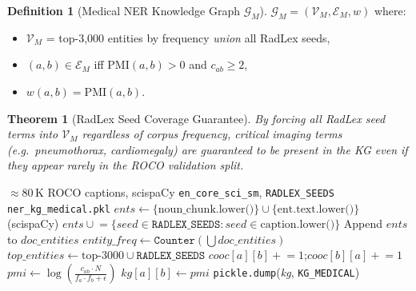 \documentclass[12pt, a4paper]{article}
\theoremstyle{definition}
\newtheorem{definition}{Definition}[section]
\theoremstyle{plain}
\newtheorem{theorem}{Theorem}[section]
\theoremstyle{remark}
\newcommand{\KG}{\mathcal{G}}
\begin{document}
\begin{definition}[Medical NER Knowledge Graph $\KG_M$]
$\KG_M = (\mathcal{V}_M, \mathcal{E}_M, w)$ where:
\begin{itemize}
  \item $\mathcal{V}_M$ = top-3,000 entities by frequency \emph{union} all RadLex seeds,
  \item $(a,b) \in \mathcal{E}_M$ iff $\text{PMI}(a,b) > 0$ and $c_{ab} \geq 2$,
  \item $w(a,b) = \text{PMI}(a,b)$.
\end{itemize}
\end{definition}

\begin{theorem}[RadLex Seed Coverage Guarantee]
By forcing all RadLex seed terms into $\mathcal{V}_M$ regardless of corpus frequency, critical imaging terms (e.g.\ \emph{pneumothorax}, \emph{cardiomegaly}) are guaranteed to be present in the KG even if they appear rarely in the ROCO validation split.
\end{theorem}

\begin{algorithm}[H]
\caption{BUILD\_MEDICAL\_NER\_KG}
\label{alg:kg_medical}
\begin{algorithmic}[1]
\Require $\approx$80\,K ROCO captions, scispaCy \texttt{en\_core\_sci\_sm}, \texttt{RADLEX\_SEEDS}
\Ensure \texttt{ner\_kg\_medical.pkl}
  \State $\textit{ents} \gets \{\text{noun\_chunk.lower()}\} \cup \{\text{ent.text.lower()}\}$ (scispaCy)
  \State $\textit{ents} \mathrel{\cup}= \{\textit{seed} \in \texttt{RADLEX\_SEEDS} : \textit{seed} \in \text{caption.lower()}\}$
  \State Append $\textit{ents}$ to $\textit{doc\_entities}$
\EndFor
\State $\textit{entity\_freq} \gets \texttt{Counter}(\bigcup \textit{doc\_entities})$
\State $\textit{top\_entities} \gets \text{top-}3000 \cup \texttt{RADLEX\_SEEDS}$
    \State $\textit{cooc}[a][b] \mathrel{+}= 1$;\quad $\textit{cooc}[b][a] \mathrel{+}= 1$
  \EndFor
\EndFor
{}
  \State $\textit{pmi} \gets \log\!\left(\frac{c_{ab} \cdot N}{f_a \cdot f_b + \epsilon}\right)$
    \State $\textit{kg}[a][b] \gets \textit{pmi}$
  \EndIf
\EndFor
\State \texttt{pickle.dump}(\textit{kg}, \texttt{KG\_MEDICAL})
\end{algorithmic}
\end{algorithm}
\end{document}
